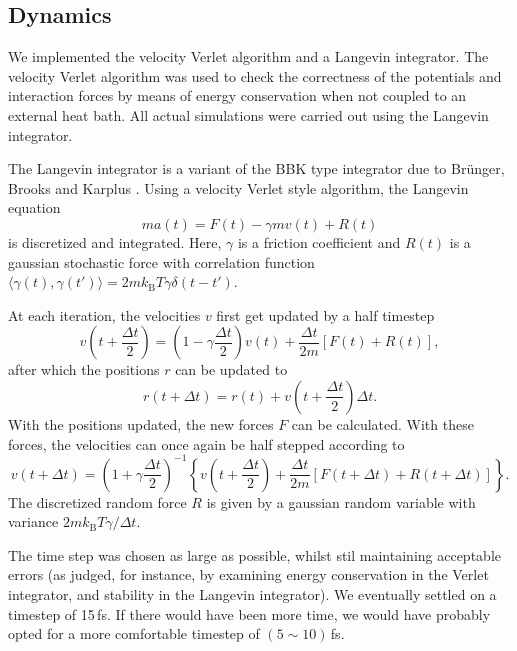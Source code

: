 \subsection{Dynamics}
We implemented the velocity Verlet algorithm and a Langevin integrator. The velocity Verlet algorithm was used to check the correctness of the potentials and interaction forces by means of energy conservation when not coupled to an external heat bath. All actual simulations were carried out using the Langevin integrator.

The Langevin integrator is a variant of the BBK type integrator due to Br{\"u}nger, Brooks and Karplus \cite{brunger1984stochastic}. Using a velocity Verlet style algorithm, the Langevin equation
\begin{equation}
m a(t) = F(t) - \gamma m v(t) + R(t)
\end{equation}
is discretized and integrated. Here, $\gamma$ is a friction coefficient and $R(t)$ is a gaussian stochastic force with correlation function $\langle\gamma(t), \gamma(t')\rangle = 2 m k_\text{B} T \gamma \delta(t-t')$.

At each iteration, the velocities $v$ first get updated by a half timestep
\begin{equation}
v\left(t + \frac{\Delta t}{2}\right)
= \left(1 - \gamma\frac{\Delta t}{2}\right) v(t)
	+ \frac{\Delta t}{2m} [F(t) + R(t)],
\end{equation}
after which the positions $r$ can be updated to
\begin{equation}
r(t + \Delta t)
= r(t) + v\left(t + \frac{\Delta t}{2}\right) \Delta t.
\end{equation}
With the positions updated, the new forces $F$ can be calculated. With these forces, the velocities can once again be half stepped according to
\begin{equation}
v(t + \Delta t) = \left(1 + \gamma \frac{\Delta t}{2}\right)^{-1}
\left\{
	v\left(t + \frac{\Delta t}{2}\right)
	+ \frac{\Delta t}{2m} \left[
			F(t + \Delta t) + R(t + \Delta t)
	\right]
\right\}.
\end{equation}
The discretized random force $R$ is given by a gaussian random variable with variance $2 m k_\text{B} T \gamma / \Delta t$.

The time step was chosen as large as possible, whilst stil maintaining acceptable errors (as judged, for instance, by examining energy conservation in the Verlet integrator, and stability in the Langevin integrator).
We eventually settled on a timestep of 15\,fs. If there would have been more time, we would have probably opted for a more comfortable timestep of $(5\sim10)$\,fs.

